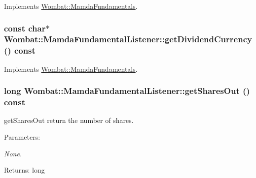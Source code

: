 Implements \hyperlink{classWombat_1_1MamdaFundamentals_4606684f0bdf3fa9a9a87e51eb0a7c99}{Wombat::Mamda\-Fundamentals}.\hypertarget{classWombat_1_1MamdaFundamentalListener_6ef9676f4d187e8cdb6e2211260b4768}{
\subsubsection[getDividendCurrency]{\setlength{\rightskip}{0pt plus 5cm}const char$\ast$ Wombat::Mamda\-Fundamental\-Listener::get\-Dividend\-Currency () const}}
\label{classWombat_1_1MamdaFundamentalListener_6ef9676f4d187e8cdb6e2211260b4768}




Implements \hyperlink{classWombat_1_1MamdaFundamentals_fb9076a1d81b7f5c7480950521eff35a}{Wombat::Mamda\-Fundamentals}.\hypertarget{classWombat_1_1MamdaFundamentalListener_39395ed6d7896ff0d5ac8594199fbdc7}{
\subsubsection[getSharesOut]{\setlength{\rightskip}{0pt plus 5cm}long Wombat::Mamda\-Fundamental\-Listener::get\-Shares\-Out () const}}
\label{classWombat_1_1MamdaFundamentalListener_39395ed6d7896ff0d5ac8594199fbdc7}


get\-Shares\-Out return the number of shares. 

\begin{Desc}
\item[Parameters:]
\begin{description}
\item[{\em None.}]\end{description}
\end{Desc}
\begin{Desc}
\item[Returns:]long\end{Desc}


